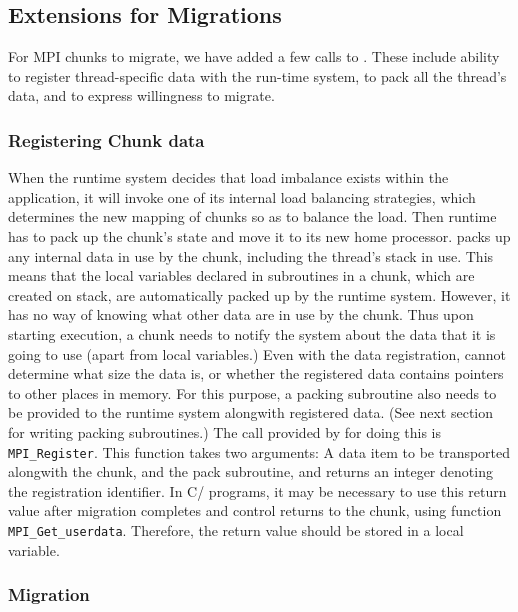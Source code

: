 \documentclass[10pt]{article}
\begin{document}
\subsection{Extensions for Migrations}

For MPI chunks to migrate, we have added a few calls to \ampi{}. These include
ability to register thread-specific data with the run-time system, to pack all
the thread's data, and to express willingness to migrate.

\subsubsection{Registering Chunk data}

When the \ampi{} runtime system decides that load imbalance exists within the
application, it will invoke one of its internal load balancing strategies,
which determines the new mapping of \ampi{} chunks so as to balance the load.
Then \ampi{} runtime has to pack up the chunk's state and move it to its new
home processor. \ampi{} packs up any internal data in use by the chunk,
including the thread's stack in use. This means that the local variables
declared in subroutines in a chunk, which are created on stack, are
automatically packed up by the \ampi{} runtime system. However, it has no way
of knowing what other data are in use by the chunk. Thus upon starting
execution, a chunk needs to notify the system about the data that it is going
to use (apart from local variables.) Even with the data registration, \ampi{}
cannot determine what size the data is, or whether the registered data contains
pointers to other places in memory. For this purpose, a packing subroutine also
needs to be provided to the \ampi{} runtime system alongwith registered data.
(See next section for writing packing subroutines.) The call provided by
\ampi{} for doing this is \texttt{MPI\_Register}. This function takes two
arguments: A data item to be transported alongwith the chunk, and the pack
subroutine, and returns an integer denoting the registration identifier. In
C/\CC{} programs, it may be necessary to use this return value after migration
completes and control returns to the chunk, using function
\texttt{MPI\_Get\_userdata}. Therefore, the return value should be stored in a
local variable.

\subsubsection{Migration}
\end{document}
